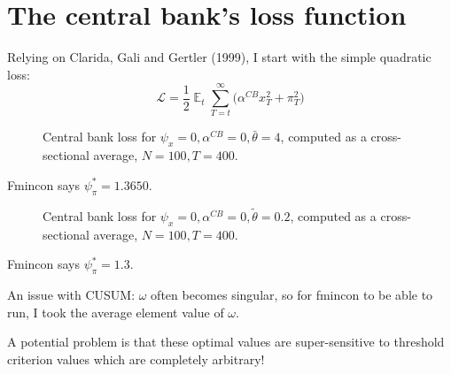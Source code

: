 \documentclass[11pt]{article}
\def \myFigPath {../figures/}
\renewcommand{\[}{\begin{equation}}
\renewcommand{\]}{\end{equation}}
\DeclareMathOperator{\E}{\mathbb{E}}
\def\myAdjustableFigScale{0.14}
\begin{document}

\clearpage

\newpage
\section{The central bank's loss function}
Relying on Clarida, Gali and Gertler (1999), I start with the simple quadratic loss:
\begin{equation}
\mathcal{L} = \frac{1}{2} \E_t\sum_{T=t}^{\infty} \bigg( \alpha^{CB} x_T^2 + \pi_T^2\bigg)
\end{equation}

\begin{figure}[h!]
\caption{Central bank loss for $\psi_x=0, \alpha^{CB} = 0, \bar{\theta}=4$, computed as a cross-sectional average, $N=100, T=400$.}
\end{figure}

Fmincon says $\psi_{\pi}^* = 1.3650$.

\begin{figure}[h!]
\caption{Central bank loss for $\psi_x=0, \alpha^{CB} = 0, \tilde{\theta}=0.2$, computed as a cross-sectional average, $N=100, T=400$.}
\end{figure}

Fmincon says $\psi_{\pi}^* = 1.3$.
     
An issue with CUSUM: $\omega$ often becomes singular, so for fmincon to be able to run, I took the average element value of $\omega$. 

A potential problem is that these optimal values are super-sensitive to threshold criterion values which are completely arbitrary!
\end{document}
